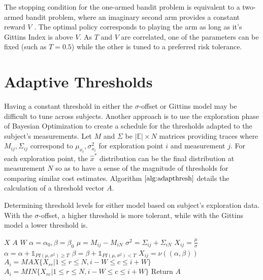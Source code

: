 The stopping condition for the one-armed bandit problem is equivalent to a two-armed bandit problem, where an imaginary second arm provides a constant reward $V$ \citep{gelman2004bayesian}. The optimal policy corresponds to playing the arm as long as it's Gittins Index is above $V$. As $T$ and $V$ are correlated, one of the parameters can be fixed (such as $T=0.5$) while the other is tuned to a preferred risk tolerance.

\section{Adaptive Thresholds}
Having a constant threshold in either the $\sigma$-offset or Gittins model may be difficult to tune across subjects. Another approach is to use the exploration phase of Bayesian Optimization to create a schedule for the thresholds adapted to the subject's measurements. Let $M$ and $\Sigma$ be $\vert \mathbb{E}\vert \times N$ matrices providing traces where $M_{ij}, \Sigma_{ij}$ correspond to $\mu_{x_t}, \sigma^2_{x_t}$ for exploration point $i$ and measurement $j$. For each exploration point, the $\hat{x}^*$ distribution can be the final distribution at measurement $N$ so as to have a sense of the magnitude of thresholds for comparing similar cost estimates. Algorithm $\ref{alg:adapthresh}$ details the calculation of a threshold vector $A$.

\begin{algorithm}[t]
\caption{Determining threshold levels for either model based on subject's exploration data. With the $\sigma$-offset, a higher threshold is more tolerant, while with the Gittins model a lower threshold is.}
\label{alg:adapthresh}
\begin{algorithmic}
\State {} $X$
\State {} $A$
\State {} $W$
  \State $\alpha = \alpha_0, \beta = \beta_0$
    \State $\mu = M_{ij} - M_{iN}$
    \State $\sigma^2 = \Sigma_{ij} + \Sigma_{iN}$
      \State $X_{ij} = \frac{\mu}{\sigma}$
    \EndIf
      \State $\alpha = \alpha + \mathbb{1}_{PI(\mu, \sigma^2) \geq T}$
      \State $\beta = \beta + \mathbb{1}_{PI(\mu, \sigma^2) < T}$
      \State $X_{ij} = \nu((\alpha, \beta))$
    \EndIf
  \End
\End
{}
    \State $A_{i} = MAX\{X_{rc}\vert 1 \leq r \leq N, i-W \leq c \leq i+W\}$
  \EndIf
    \State $A_{i} = MIN\{X_{rc}\vert 1 \leq r \leq N, i-W \leq c \leq i+W\}$
  \EndIf
\End
\State Return $A$
\end{algorithmic}
\end{algorithm}

